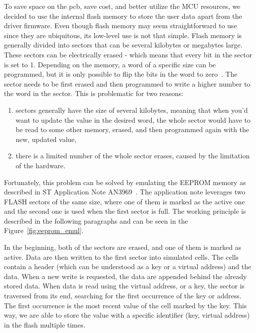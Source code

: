 To save space on the \acs{pcb}, save cost, and better utilize the MCU resources, we decided to use the internal flash memory to store the user data apart from the driver firmware.
Even though flash memory may seem straightforward to use since they are ubiquitous, its low-level use is not that simple.
Flash memory is generally divided into sectors that can be several kilobytes or megabytes large.
These sectors can be electrically erased - which means that every bit in the sector is set to 1.
Depending on the memory, a word of a specific size can be programmed, but it is only possible to flip the bits in the word to zero~\cite{mansanet_ecorax_nodate, mansanet_ecorax_nodate-1}.
The sector needs to be first erased and then programmed to write a higher number to the word in the sector.
This is problematic for two reasons:
\begin{enumerate}
    \item sectors generally have the size of several kilobytes, meaning that when you'd want to update the value in the desired word, the whole sector would have to be read to some other memory, erased, and then programmed again with the new, updated value,
    \item there is a limited number of the whole sector erases, caused by the limitation of the hardware.
\end{enumerate}

Fortunately, this problem can be solved by emulating the EEPROM memory as described in ST Application Note AN3969~\cite{stmicro_an3969_2011}.
The application note leverages two FLASH sectors of the same size, where one of them is marked as the active one and the second one is used when the first sector is full.
The working principle is described in the following paragraphs and can be seen in the Figure~\ref{fig:eeprom_emul}.

In the beginning, both of the sectors are erased, and one of them is marked as active.
Data are then written to the first sector into simulated cells.
The cells contain a header (which can be understood as a key or a virtual address) and the data.
When a new write is requested, the data are appended behind the already stored data.
When data is read using the virtual address, or a key, the sector is traversed from its end, searching for the first occurrence of the key or address.
The first occurrence is the most recent value of the cell marked by the key.
This way, we are able to store the value with a specific identifier (key, virtual address) in the flash multiple times.

